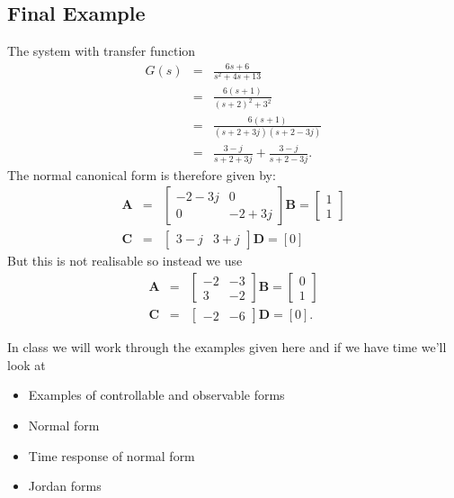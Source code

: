 \subsection*{Final Example}
 The system with transfer function
\begin{eqnarray*}G(s) &=& \frac{6s+6}{s^2 + 4s + 13}\\
&=& \frac{6(s+1)}{(s+2)^2 + 3^2} \\ &=&
\frac{6(s+1)}{(s+2+3j)(s+2-3j)}
\\ &=& \frac{3-j}{s+2+3j} + \frac{3-j}{s+2-3j}.\end{eqnarray*} The normal canonical form is
therefore given by:
\begin{eqnarray*}
\mathbf{A} &=& \left[\begin{array}{cc}
  -2-3j & 0 \\
  0 & -2+3j
\end{array}\right] \mathbf{B} = \left[\begin{array}{c}
  1 \\
  1
\end{array}\right]\\ \mathbf{C} &=& \left[\begin{array}{cc}
  3-j & 3+j
\end{array}\right] \mathbf{D} = \left[0\right]
\end{eqnarray*}
But this is not realisable so instead we use
\begin{eqnarray*}
\mathbf{A} &=& \left[\begin{array}{cc}
  -2 & -3 \\
  3 & -2
\end{array}\right] \mathbf{B} = \left[\begin{array}{c}
  0 \\
  1
\end{array}\right]\\ \mathbf{C} &=& \left[\begin{array}{cc}
  -2 & -6
\end{array}\right] \mathbf{D} = \left[0\right].
\end{eqnarray*}

\ifslidesonly
\begin{slide}
In class we will work through the examples given here
and if we have time we'll look at
\begin{itemize}
\item Examples of controllable and observable forms
\item Normal form
\item Time response of normal form
\item Jordan forms
\end{itemize}
\end{slide}
\fi


\endinput

